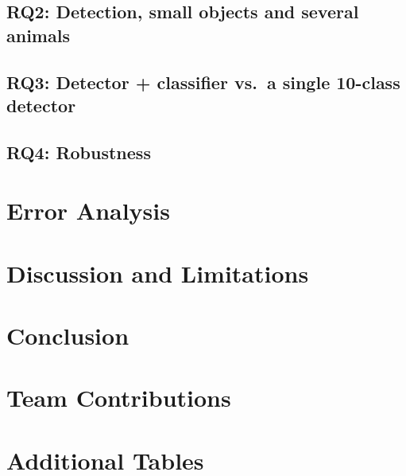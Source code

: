 \documentclass[11pt]{article}
\begin{document}



\subsection{RQ2: Detection, small objects and several animals}




\subsection{RQ3: Detector + classifier vs.\ a single 10-class detector}



\subsection{RQ4: Robustness}



\section{Error Analysis}

\section{Discussion and Limitations}

\section{Conclusion}

\section*{Team Contributions}

\FloatBarrier



\clearpage
\appendix
\section{Additional Tables}



\end{document}
